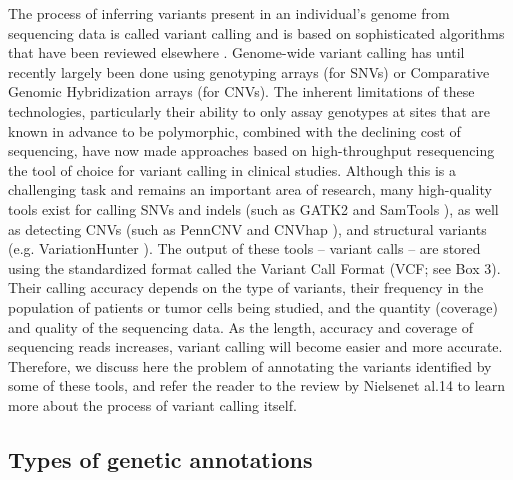 The process of inferring variants present in an individual’s genome from sequencing data is called variant calling and is based on sophisticated algorithms that have been reviewed elsewhere \cite{nielsen2011genotype}. Genome-wide variant calling has until recently largely been done using genotyping arrays (for SNVs) or Comparative Genomic Hybridization arrays (for CNVs). The inherent limitations of these technologies, particularly their ability to only assay genotypes at sites that are known in advance to be polymorphic, combined with the declining cost of sequencing, have now made approaches based on high-throughput resequencing the tool of choice for variant calling in clinical studies. Although this is a challenging task and remains an important area of research, many high-quality tools exist for calling SNVs and indels (such as GATK2 and SamTools \cite{li2009sequence}), as well as detecting CNVs (such as PennCNV \cite{wang2007penncnv} and CNVhap \cite{coin2010cnvhap}), and structural variants (e.g. VariationHunter \cite{hormozdiari2011simultaneous}). The output of these tools – variant calls – are stored using the standardized format called the Variant Call Format \cite{danecek2011variant} (VCF; see Box 3). Their calling accuracy depends on the type of variants, their frequency in the population of patients or tumor cells being studied, and the quantity (coverage) and quality of the sequencing data. As the length, accuracy and coverage of sequencing reads increases, variant calling will become easier and more accurate. Therefore, we discuss here the problem of annotating the variants identified by some of these tools, and refer the reader to the review by Nielsenet al.14 to learn more about the process of variant calling itself.

\subsection{Types of genetic annotations}

